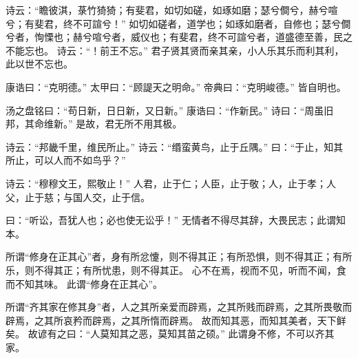 \documentclass[twoside,openany]{book}
\begin{document}
\begin{pinyinscope}
诗云：“瞻彼淇，菉竹猗猗；有斐君，如切如磋，如琢如磨；瑟兮僴兮，赫兮喧兮；有斐君，终不可諠兮！”
如切如磋者，道学也；如琢如磨者，自修也；瑟兮僴兮者，恂慄也；赫兮喧兮者，威仪也；有斐君，终不可諠兮者，道盛德至善，民之不能忘也。
诗云：“！前王不忘。”
君子贤其贤而亲其亲，小人乐其乐而利其利，此以世不忘也。

康诰曰：“克明德。”
太甲曰：“顾諟天之明命。”
帝典曰：“克明峻德。”
皆自明也。

汤之盘铭曰：“苟日新，日日新，又日新。”
康诰曰：“作新民。”
诗曰：“周虽旧邦，其命维新。”
是故，君无所不用其极。

诗云：“邦畿千里，维民所止。”
诗云：“缗蛮黄鸟，止于丘隅。”
曰：“于止，知其所止，可以人而不如鸟乎？”

诗云：“穆穆文王，熙敬止！”
人君，止于仁；人臣，止于敬；人，止于孝；人父，止于慈；与国人交，止于信。

曰：“听讼，吾犹人也；必也使无讼乎！”
无情者不得尽其辞，大畏民志；此谓知本。

所谓“修身在正其心”者，身有所忿懥，则不得其正；有所恐惧，则不得其正；有所乐，则不得其正；有所忧患，则不得其正。
心不在焉，视而不见，听而不闻，食而不知其味。
此谓“修身在正其心”。

所谓“齐其家在修其身”者，人之其所亲爱而辟焉，之其所贱而辟焉，之其所畏敬而辟焉，之其所哀矜而辟焉，之其所惰而辟焉。
故而知其恶，而知其美者，天下鲜矣。
故谚有之曰：“人莫知其之恶，莫知其苗之硕。”
此谓身不修，不可以齐其家。


\end{pinyinscope}
\end{document}
